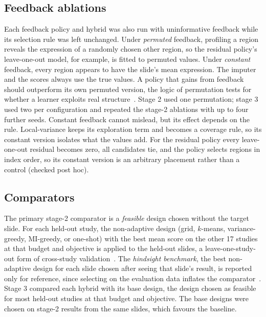 \documentclass[10pt]{article}
\begin{document}
\subsection{Feedback ablations}
\label{sec:ablations}
Each feedback policy and hybrid was also run with uninformative feedback while its selection rule was
left unchanged. Under \emph{permuted} feedback, profiling a region reveals the expression of a randomly chosen
other region, so the residual policy's leave-one-out model, for example, is fitted to permuted values. Under
\emph{constant} feedback, every region appears to have the slide's mean expression. The imputer and the scores
always use the true values. A policy that gains from feedback should outperform its own permuted version, the logic
of permutation tests for whether a learner exploits real structure~\citep{ojala2010permutation}. Stage 2 used one
permutation; stage 3 used two per configuration and repeated the stage-2 ablations with up to four further seeds.
Constant feedback cannot mislead, but its effect depends on the rule. Local-variance keeps its exploration term and
becomes a coverage rule, so its constant version isolates what the values add. For the residual policy every
leave-one-out residual becomes zero, all candidates tie, and the policy selects regions in index order, so its
constant version is an arbitrary placement rather than a control (checked post hoc).

\subsection{Comparators}
The primary stage-2 comparator is a \emph{feasible} design chosen without the target slide. For each held-out
study, the non-adaptive design (grid, $k$-means, variance-greedy, MI-greedy, or one-shot) with the best mean score
on the other 17 studies at that budget and objective is applied to the held-out slides, a leave-one-study-out
form of cross-study validation~\citep{bernau2014cross}. The \emph{hindsight benchmark}, the best non-adaptive design
for each slide chosen after seeing that slide's result, is reported only for reference, since selecting on the evaluation
data inflates the comparator~\citep{varma2006bias,cawley2010over}. Stage 3 compared each hybrid with its base
design, the design chosen as feasible for most held-out studies at that budget and objective. The base designs were
chosen on stage-2 results from the same slides, which favours the baseline.
\end{document}
